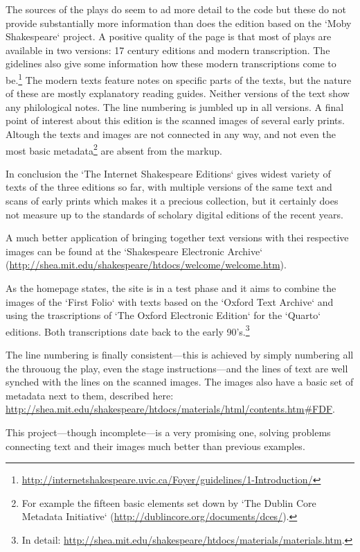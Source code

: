 \documentclass{article}
\begin{document}
The sources of the plays do seem to ad more detail to the code but these do not provide substantially more information than does the edition based on the `Moby Shakespeare` project. A positive quality of the page is  that most of plays are available in two versions: 17 century editions and modern transcription. The gidelines also give some information how these modern transcriptions come to be.\footnote{\url{http://internetshakespeare.uvic.ca/Foyer/guidelines/1-Introduction/}} The modern texts feature notes on specific parts of the texts, but the nature of these are mostly explanatory reading guides. Neither versions of the text show any philological notes. The line numbering is jumbled up in all versions.
A final point of interest about this edition is the scanned images of several early prints. Altough the texts and images are not connected in any way, and not even the most basic metadata\footnote{For example the fifteen basic elements set down by `The Dublin Core Metadata Initiative` (\url{http://dublincore.org/documents/dces/}).} are absent from the markup.

In conclusion the `The Internet Shakespeare Editions` gives widest variety of texts of the three editions so far, with multiple versions of the same text and scans of early prints which makes it a precious collection, but it certainly does not measure up to the standards of scholary digital editions of the recent years.

A much better application of bringing together text versions with thei respective images can be found at the `Shakespeare Electronic Archive` (\url{http://shea.mit.edu/shakespeare/htdocs/welcome/welcome.htm}).

As the homepage states, the site is in a test phase and it aims to combine the images of the `First Folio` with texts based on the `Oxford Text Archive` and using the trascriptions of `The Oxford Electronic Edition` for the `Quarto` editions. Both transcriptions date back to the early 90's.\footnote{In detail: \url{http://shea.mit.edu/shakespeare/htdocs/materials/materials.htm}.} 

The line numbering is finally consistent---this is achieved by simply numbering all the thrououg the play, even the stage instructions---and the lines of text are well synched with the lines on the scanned images. The images also have a basic set of metadata next to them, described here: \url{http://shea.mit.edu/shakespeare/htdocs/materials/html/contents.htm#FDF}.

This project---though incomplete---is a very promising one, solving problems connecting text and their images much better than previous examples.
\end{document}
